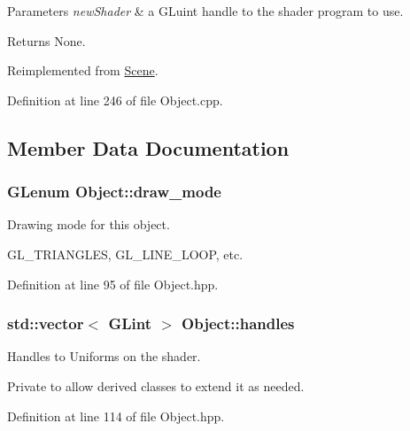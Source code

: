 \begin{DoxyParams}{Parameters}
{\em new\-Shader} & a G\-Luint handle to the shader program to use.\\
\hline
\end{DoxyParams}
\begin{DoxyReturn}{Returns}
None. 
\end{DoxyReturn}


Reimplemented from \hyperlink{class_scene_a7137a7302c21ac4dd44e746bfb6f7cf8}{Scene}.



Definition at line 246 of file Object.\-cpp.



\subsection{Member Data Documentation}
\hypertarget{class_object_a82764b385767d989f27d301ab206acb8}{
\subsubsection[{draw\-\_\-mode}]{\setlength{\rightskip}{0pt plus 5cm}G\-Lenum Object\-::draw\-\_\-mode\hspace{0.3cm}{\ttfamily [protected]}}}\label{class_object_a82764b385767d989f27d301ab206acb8}


Drawing mode for this object. 

G\-L\-\_\-\-T\-R\-I\-A\-N\-G\-L\-E\-S, G\-L\-\_\-\-L\-I\-N\-E\-\_\-\-L\-O\-O\-P, etc. 

Definition at line 95 of file Object.\-hpp.

\hypertarget{class_object_acd6c7021617ea334915a1525f9519bc5}{
\subsubsection[{handles}]{\setlength{\rightskip}{0pt plus 5cm}std\-::vector$<$ G\-Lint $>$ Object\-::handles\hspace{0.3cm}{\ttfamily [protected]}}}\label{class_object_acd6c7021617ea334915a1525f9519bc5}


Handles to Uniforms on the shader. 

Private to allow derived classes to extend it as needed. 

Definition at line 114 of file Object.\-hpp.

